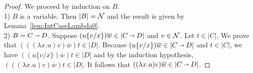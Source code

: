 \documentclass[orivec]{llncs}
\newif\ifnonotes\nonotesfalse
\newcommand{\Comment}[1]{\ifnonotes\else{\color{red}    \noindent{\bf Comment: }#1}\fi}
\begin{document}
\begin{proof}
 We proceed by induction on $B$.
\\
1) $B$ is a variable. Then $|B| = \mathcal{N}$ and the result is given by Lemma~\ref{lem:IntCaseLambda0}.
\\
2) $B= C\vlim D$.
Suppose $(u\{v/x\})\overline{w} \in |C\vlim D|$ and $v\in\mathcal{N}$. Let $t\in|C|$. We prove that  $(((\lambda x.u) v)\overline{w})t \in |D|$. Because $(u\{v/x\})\overline{w} \in |C\vlim D|$ and $t\in|C|$, we have $((u\{v/x\})\overline{w})t \in |D|$ and by the induction hypothesis, $(((\lambda x.u) v)\overline{w})t \in |D|$. It follows that $((\lambda x.u) v)\overline{w} \in |C\vlim D|$.
\end{proof}
%
%
%
%
%
%
%
%
%
%
%
\end{document}

